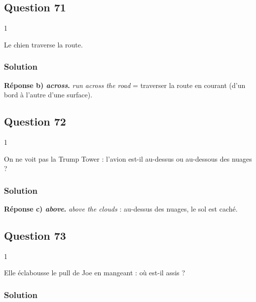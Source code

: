 \documentclass[11pt,a4paper]{article}
\begin{document}
\hypertarget{question-71}{%
\subsection{Question 71}\label{question-71}}

\begin{indication}{1}

Le chien traverse la route.

\end{indication}

\hypertarget{solution-70}{%
\subsubsection{Solution}\label{solution-70}}

\textbf{Réponse b) \emph{across}.} \emph{run across the road} = traverser la route en courant (d'un bord à l'autre d'une surface).

\hypertarget{question-72}{%
\subsection{Question 72}\label{question-72}}

\begin{indication}{1}

On ne voit pas la Trump Tower : l'avion est-il au-dessus ou au-dessous des nuages ?

\end{indication}

\hypertarget{solution-71}{%
\subsubsection{Solution}\label{solution-71}}

\textbf{Réponse c) \emph{above}.} \emph{above the clouds} : au-dessus des nuages, le sol est caché.

\hypertarget{question-73}{%
\subsection{Question 73}\label{question-73}}

\begin{indication}{1}

Elle éclabousse le pull de Joe en mangeant : où est-il assis ?

\end{indication}

\hypertarget{solution-72}{%
\subsubsection{Solution}\label{solution-72}}
\end{document}
